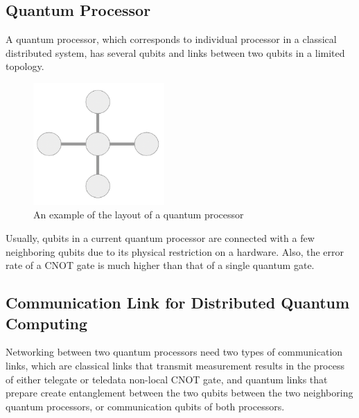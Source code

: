 \newpage

 \subsection{Quantum Processor}
  A quantum processor, which corresponds to individual processor in a classical distributed system, has several qubits and links between two qubits in a limited topology.
  
  \begin{figure}[ht]
  	\begin{center}
  		\includegraphics[width=5cm]{img/processor.png}
		\caption{An example of the layout of a quantum processor}
	\end{center}
\end{figure}
	
Usually, qubits in a current quantum processor are connected with a few neighboring qubits due to its physical restriction on a hardware.  Also, the error rate of a CNOT gate is much higher than that of a single quantum gate.
 
 \subsection{Communication Link for Distributed Quantum Computing}
Networking between two quantum processors need two types of communication links, which are classical links that transmit measurement results in the process of either telegate or teledata non-local CNOT gate, and quantum links that prepare create entanglement between the two qubits between the two neighboring quantum processors, or communication qubits of both processors.    

%
